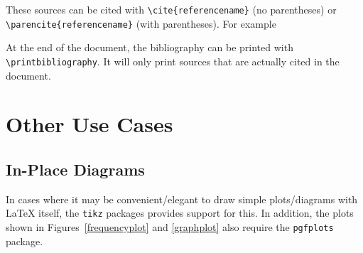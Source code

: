 \documentclass[11pt, twoside]{article}
\begin{document}
These sources can be cited with \lstinline|\cite{referencename}| (no parentheses) or \lstinline|\parencite{referencename}| (with parentheses). For example \parencite{colu92} \cite{phil99}

At the end of the document, the bibliography can be printed with \lstinline{\printbibliography}. It will only print sources that are actually cited in the document.

\section{Other Use Cases}

\subsection{In-Place Diagrams}

In cases where it may be convenient/elegant to draw simple plots/diagrams with LaTeX itself, the \lstinline{tikz} packages provides support for this. In addition, the plots shown in Figures~\ref{frequencyplot} and \ref{graphplot} also require the \lstinline{pgfplots} package.


\end{document}
